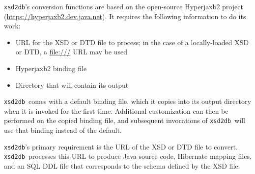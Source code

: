 \documentclass[10pt]{bmc_article}
\newenvironment{bmcformat}{\begin{raggedright}\baselineskip20pt\sloppy\setboolean{publ}{false}}{\end{raggedright}\baselineskip20pt\sloppy}
\def\xsd2db{\texttt{xsd2db}}
\begin{document}
\begin{bmcformat}
\xsd2db's conversion functions are based on the open-source Hyperjaxb2 project (\url{https://hyperjaxb2.dev.java.net}).  It requires the following information to do its work:
\begin{itemize}
\item URL for the XSD or DTD file to process; in the case of a locally-loaded XSD or DTD, a \url{file:///} URL may be used

\item Hyperjaxb2 binding file

\item Directory that will contain its output
\end{itemize}
\xsd2db\ comes with a default binding file, which it copies into its output directory when it is invoked for the first time.  Additional customization can then be performed on the copied binding file, and subsequent invocations of \xsd2db\ will use that binding instead of the default.\pb

\xsd2db's primary requirement is the URL of the XSD or DTD file to convert.  \xsd2db\  processes this URL to produce Java source code, Hibernate mapping files, and an SQL DDL file that corresponds to the schema defined by the XSD file.\pb


\end{bmcformat}
\end{document}
